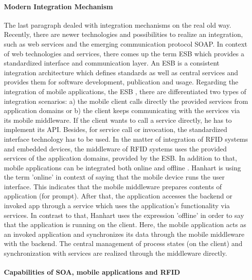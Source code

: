 \paragraph{Modern Integration Mechanism}

The last paragraph dealed with integration mechanisms on the real old way. Recently, there are newer technologies and possibilities to realize an integration, such as web services and the emerging communication protocol \ac{SOAP}. In context of web technologies and services, there comes up the term \ac{ESB}\cite[p.141 ff.]{mobile} which provides a standardized interface and communication layer. An ESB is a consistent integration architecture which defines standards as well as central services and provides them for software development, publication and usage. Regarding the integration of mobile applications, the ESB \cite[p.143]{mobile}, there are differentiated two types of integration scenarios: a) the mobile client calls directly the provided services from application domains or b) the client keeps communicating with the services via its mobile middleware. If the client wants to call a service directly, he has to implement its \ac{API}. Besides, for service call or invocation, the standardized interface technology has to be used.
In the matter of integration of RFID systems and embedded devices, the middleware of RFID systems uses the provided services of the application domains, provided by the ESB. In addition to that, mobile applications can be integrated both online and offline \cite[p.146 ff.]{mobile}. Hanhart is using the term 'online' in context of saying that the mobile device runs the user interface. This indicates that the mobile middleware prepares contents of application (for prompt). After that, the application accesses the backend or invoked app through a service which uses the application's functionality via services. In contrast to that, Hanhart uses the expression 'offline' in order to say that the application is running on the client. Here, the mobile application acts as an invoked application and synchronizes its data through the mobile middleware with the backend. The central management of process states (on the client) and synchronization with services are realized through the middleware directly.

\paragraph{Capabilities of SOA, mobile applications and RFID}

